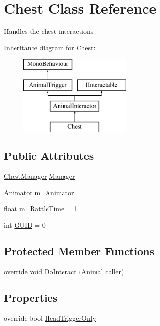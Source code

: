 \hypertarget{class_chest}{}\section{Chest Class Reference}
\label{class_chest}


Handles the chest interactions  


Inheritance diagram for Chest\+:\begin{figure}[H]
\begin{center}
\leavevmode
\includegraphics[height=4.000000cm]{class_chest}
\end{center}
\end{figure}
\subsection*{Public Attributes}
\begin{DoxyCompactItemize}
\item 
\mbox{\hyperlink{class_chest_manager}{Chest\+Manager}} \mbox{\hyperlink{class_chest_a012418cebfc5cd47f8327ca22a52caac}{Manager}}
\item 
Animator \mbox{\hyperlink{class_chest_a455179664d3fcbbbb12f62ddc0d39e0b}{m\+\_\+\+Animator}}
\item 
float \mbox{\hyperlink{class_chest_a8641eecb8e8c999aa4ec8736c761f653}{m\+\_\+\+Rattle\+Time}} = 1
\item 
int \mbox{\hyperlink{class_chest_ae844061d44904d0bf9ae41abf9aebaf9}{G\+U\+ID}} = 0
\end{DoxyCompactItemize}
\subsection*{Protected Member Functions}
\begin{DoxyCompactItemize}
\item 
override void \mbox{\hyperlink{class_chest_a61fad29e7dd236a2fbfce7b9c2e51841}{Do\+Interact}} (\mbox{\hyperlink{class_animal}{Animal}} caller)
\end{DoxyCompactItemize}
\subsection*{Properties}
\begin{DoxyCompactItemize}
\item 
override bool \mbox{\hyperlink{class_chest_af0b0b442ab855da49092676fe578b6d9}{Head\+Trigger\+Only}}
\end{DoxyCompactItemize}
